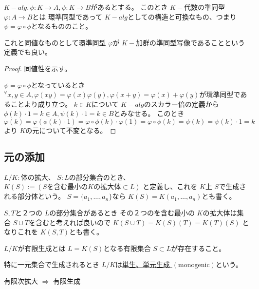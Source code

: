 \documentclass[../master_galois_theory]{subfiles}
\begin{document}
\begin{defi}
  $K-alg , \phi : K \longrightarrow A , \psi : K \longrightarrow B$があるとする。
  このとき $K-$代数の準同型 $\varphi : A \longrightarrow B$とは
  環準同型であって $K-alg$としての構造と可換なもの、つまり $\psi = \varphi \circ \phi$となるもののこと。

  これと同値なものとして環準同型 $\varphi$が $K-$加群の準同型写像であることという定義でも良い。
\end{defi}

\begin{proof}
  同値性を示す。

  $\psi = \varphi \circ \phi$となっているとき
  ${}^\forall x , y \in A , \varphi(xy) = \varphi(x) \varphi(y) , \varphi(x + y) = \varphi(x) + \varphi(y)$が環準同型であることより成り立つ。
  $k \in K$について $K-alg$のスカラー倍の定義から $\phi(k) \cdot 1 = k \in A , \psi(k) \cdot 1 = k \in B$とみなせる。
  このとき $\varphi(k) = \varphi(\phi(k) \cdot 1) = \varphi \circ \phi(k) \cdot \varphi(1) = \varphi \circ \phi(k) = \psi(k) = \psi(k) \cdot 1 = k$より $K$の元について不変となる。

\end{proof}

\subsection{元の添加}

\begin{defi}
  $L/K:$体の拡大、 $S:L$の部分集合のとき、
  $K(S) := (Sを含む最小のKの拡大体 \subset L)$
  と定義し、これを $K$上 $S$で生成される部分体という。
  $S = \{ a_1 , \dots , a_n\}$なら
  $K(S) = K(a_1 , \dots , a_n)$とも書く。

  $S,T$と２つの $L$の部分集合があるとき
  その２つのを含む最小の $K$の拡大体は集合 $S \cup T$を含むと考えれば良いので
  $K(S \cup T) = K(S)(T) = K(T)(S)$
  となりこれを $K(S,T)$とも書く。
\end{defi}

\begin{defi}
  $L/K$が有限生成とは $L = K(S)$となる有限集合 $S \subset L$が存在すること。

  特に一元集合で生成されるとき $L/K$は\underline{単生、単元生成 $(\mathrm{monogenic})$}という。
\end{defi}

\begin{rem}
  有限次拡大 $\Rightarrow$ 有限生成
\end{rem}
\end{document}
